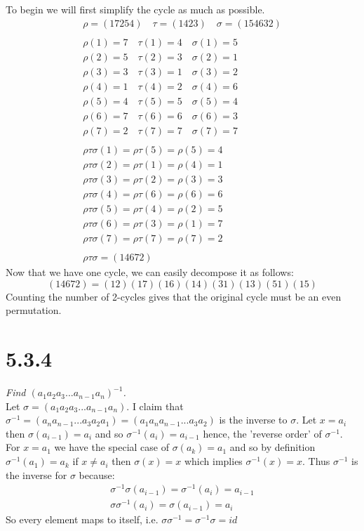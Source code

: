 \documentclass[a4paper, 11pt]{article}
\begin{document}
\noindent To begin we will first simplify the cycle as much as possible. 
	\begin{align*}
		\rho = (17254) \quad \tau = (1423) \quad \sigma = (154632) \\ \\ 
		\rho(1) = 7 \quad \tau(1) = 4 \quad \sigma(1) = 5 \\ 
		\rho(2) = 5 \quad \tau(2) = 3 \quad \sigma(2) = 1 \\ 
		\rho(3) = 3 \quad \tau(3) = 1 \quad \sigma(3) = 2 \\ 
		\rho(4) = 1 \quad \tau(4) = 2 \quad \sigma(4) = 6 \\ 
		\rho(5) = 4 \quad \tau(5) = 5 \quad \sigma(5) = 4 \\ 
		\rho(6) = 7 \quad \tau(6) = 6 \quad \sigma(6) = 3 \\ 
		\rho(7) = 2 \quad \tau(7) = 7 \quad \sigma(7) = 7 \\ \\ 
		\rho\tau\sigma(1) = \rho\tau(5) = \rho(5) = 4 \\ 
		\rho\tau\sigma(2) = \rho\tau(1) = \rho(4) = 1 \\ 
		\rho\tau\sigma(3) = \rho\tau(2) = \rho(3) = 3 \\ 
		\rho\tau\sigma(4) = \rho\tau(6) = \rho(6) = 6 \\ 
		\rho\tau\sigma(5) = \rho\tau(4) = \rho(2) = 5 \\ 
		\rho\tau\sigma(6) = \rho\tau(3) = \rho(1) = 7 \\ 
		\rho\tau\sigma(7) = \rho\tau(7) = \rho(7) = 2 \\ \\ 
		\rho\tau\sigma  = (14672)
	\end{align*}
Now that we have one cycle, we can easily decompose it as follows: 
	\begin{equation*}
		(14672) = (12)(17)(16)(14)(31)(13)(51)(15)
	\end{equation*}
Counting the number of 2-cycles gives that the original cycle must be an even permutation. 

\section*{5.3.4}
\textit{Find $(a_1a_2a_3...a_{n-1}a_n)^{-1}$. } \\ 

\noindent Let $ \sigma = (a_1a_2a_3...a_{n-1}a_n)$. I claim that $\sigma^{-1}=(a_na_{n-1}...a_3a_2a_1) = (a_1a_{n}a_{n-1}...a_3a_2)$ is the inverse to $\sigma$. Let $x = a_i$ then $\sigma(a_{i-1})= a_i$ and so $\sigma^{-1}(a_i)=a_{i-1}$ hence, the 'reverse order' of $\sigma^{-1}$. For $x = a_1$ we have the special case of $\sigma(a_k)=a_1$ and so by definition $\sigma^{-1}(a_1)=a_k$ if $x\neq a_i$ then $\sigma(x) = x$ which implies $\sigma^{-1}(x)=x$. Thus $\sigma^{-1}$ is the inverse for $\sigma$ because: 
	\begin{align*}
		\sigma^{-1}\sigma(a_{i-1}) = \sigma^{-1}(a_i) = a_{i-1} \\ 
		\sigma\sigma^{-1}(a_i) = \sigma(a_{i-1}) = a_i
	\end{align*}
So every element maps to itself, i.e. $\sigma\sigma^{-1} = \sigma^{-1}\sigma = id$
\end{document}
